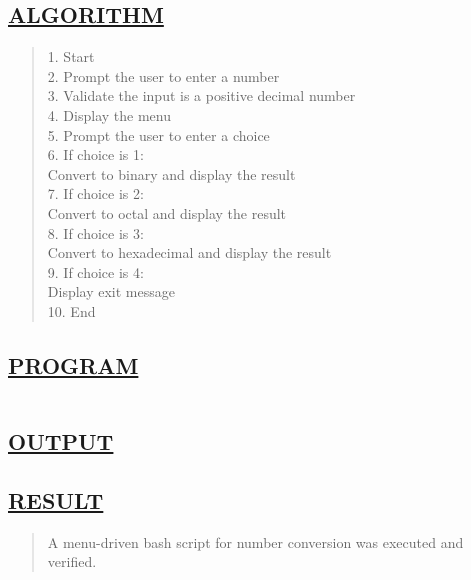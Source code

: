 \documentclass[a4paper, 12pt]{article}
\begin{document}
\subsection*{\underline{ALGORITHM}}
\begin{quote}
1. Start\\
2. Prompt the user to enter a number\\
3. Validate the input is a positive decimal number\\
4. Display the menu\\
5. Prompt the user to enter a choice\\
6. If choice is 1:\\
   Convert to binary and display the result\\
7. If choice is 2:\\
   Convert to octal and display the result\\
8. If choice is 3:\\
   Convert to hexadecimal and display the result\\
9. If choice is 4:\\
   Display exit message\\
10. End\\
\end{quote}

\subsection*{\underline{PROGRAM}}
\begin{quote}
\inputminted[fontsize=\small,breaklines,breakanywhere]{sh}{shell1.sh}%
\end{quote}


\subsection*{\underline{OUTPUT}}

\begin{figure}[H] 
    \centering
\end{figure}


\subsection*{\underline{RESULT}}
\begin{quote}
A menu-driven bash script for number conversion was executed and verified.
\end{quote}
\end{document}
